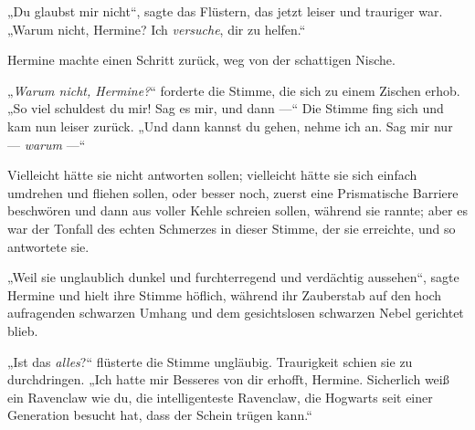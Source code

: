 „Du glaubst mir nicht“, sagte das Flüstern, das jetzt leiser und trauriger war.
„Warum nicht, Hermine? Ich \emph{versuche}, dir zu helfen.“

Hermine machte einen Schritt zurück, weg von der schattigen Nische.

„\emph{Warum nicht, Hermine?}“ forderte die Stimme, die sich zu einem Zischen erhob.
„So viel schuldest du mir! Sag es mir, und dann —“ Die Stimme fing sich und kam nun leiser zurück.
„Und dann kannst du gehen, nehme ich an. Sag mir nur — \emph{warum} —“

Vielleicht hätte sie nicht antworten sollen; vielleicht hätte sie sich einfach umdrehen und fliehen sollen, oder besser noch, zuerst eine Prismatische Barriere beschwören und dann aus voller Kehle schreien sollen, während sie rannte; aber es war der Tonfall des echten Schmerzes in dieser Stimme, der sie erreichte, und so antwortete sie.

„Weil sie unglaublich dunkel und furchterregend und verdächtig aussehen“, sagte Hermine und hielt ihre Stimme höflich, während ihr Zauberstab auf den hoch aufragenden schwarzen Umhang und dem gesichtslosen schwarzen Nebel gerichtet blieb.

„Ist das \emph{alles}?“ flüsterte die Stimme ungläubig. Traurigkeit schien sie zu durchdringen.
„Ich hatte mir Besseres von dir erhofft, Hermine. Sicherlich weiß ein Ravenclaw wie du, die intelligenteste Ravenclaw, die Hogwarts seit einer Generation besucht hat, dass der Schein trügen kann.“

